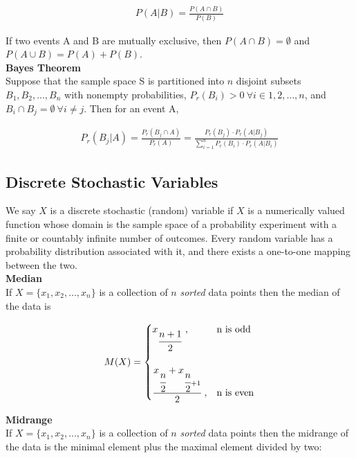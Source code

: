 \documentclass{article}
\numberwithin{theorem}{subsection}
\numberwithin{theorem}{subsubsection}
\numberwithin{lemma}{subsection}
\numberwithin{lemma}{subsubsection}
\theoremstyle{definition}
\numberwithin{definition}{subsection}
\numberwithin{definition}{subsubsection}
\begin{document}
\begin{gather*}
    P(A|B) = \frac{P(A \cap B)}{P(B)}
\end{gather*}

\noindent If two events A and B are mutually exclusive, then $P(A \cap B) = \emptyset$ and $P(A \cup B) = P(A) + P(B)$.\\

\noindent \textbf{Bayes Theorem} \\
\indent Suppose that the sample space S is partitioned into $n$ disjoint subsets $B_{1},B_{2},...,B_{n}$ with nonempty probabilities, $P_{r}(B_{i}) > 0\ \forall i \in {1,2,...,n}$, and $B_{i} \cap B_{j} = \emptyset\ \forall i \neq j$. Then for an event A,

\begin{gather*}
    P_{r}(B_{j} | A) = \frac{P_{r}(B_{j} \cap A)}{P_{r}(A)} = \frac{P_{r}(B_{j}) \cdot P_{r}(A | B_{j})}{\sum_{i = 1}^{n} P_{r}(B_{i}) \cdot P_{r}(A | B_{i})}
\end{gather*}


\subsection{Discrete Stochastic Variables}

We say $X$ is a discrete stochastic (random) variable if $X$ is a numerically valued function whose domain is the sample space of a probability experiment with a finite or countably infinite number of outcomes. Every random variable has a probability distribution associated with it, and there exists a one-to-one mapping between the two. \\

\noindent \textbf{Median}\\
\indent If $X = \{x_{1},x_{2},...,x_{n}\}$ is a collection of $n$ \textit{sorted} data points then the median of the data is

\begin{gather*}
    M(X) =  \begin{cases} 
                      x_{\cfrac{n+1}{2}}\ , & $n$ \text{ is odd}\\\\
                      \cfrac{x_{\cfrac{n}{2}} + x_{\cfrac{n}{2} + 1}}{2}\ , & $n$ \text{ is even}
                   \end{cases}
\end{gather*}

\noindent \textbf{Midrange} \\
\indent If $X = \{x_{1},x_{2},...,x_{n}\}$ is a collection of $n$ \textit{sorted} data points then the midrange of the data is the minimal element plus the maximal element divided by two:
\end{document}
